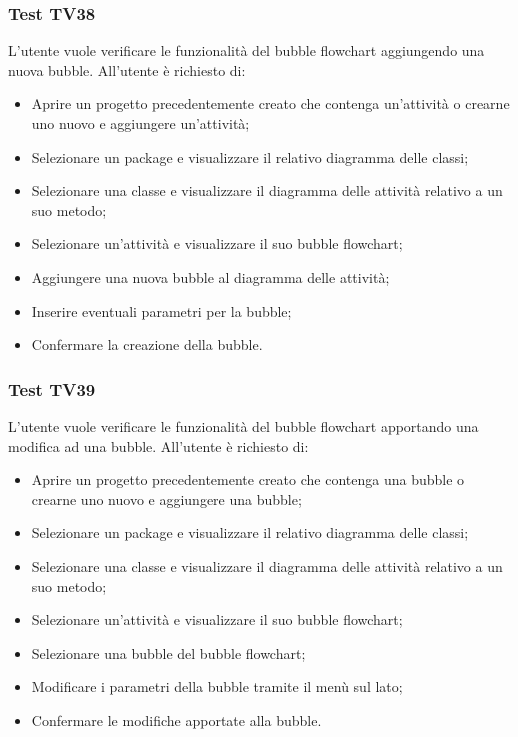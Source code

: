 \documentclass[../PianoDiQualifica.tex]{subfiles}
\begin{document}
	
	
	\subsubsection{Test TV38} 
	L'utente vuole verificare le funzionalità del bubble flowchart aggiungendo una nuova bubble. 
	All'utente è richiesto di: 
	\begin{itemize} 
		\item Aprire un progetto precedentemente creato che contenga un'attività o crearne uno nuovo e aggiungere un'attività;
		\item Selezionare un package e visualizzare il relativo diagramma delle classi; 
		\item Selezionare una classe e visualizzare il diagramma delle attività relativo a un suo metodo; %
		\item Selezionare un'attività e visualizzare il suo bubble flowchart; 
		\item Aggiungere una nuova bubble al diagramma delle attività; 
		\item Inserire eventuali parametri per la bubble; 
		\item Confermare la creazione della bubble.%
	\end{itemize} 
	
	\subsubsection{Test TV39} 
	L'utente vuole verificare le funzionalità del bubble flowchart apportando una modifica ad una bubble. 
	All'utente è richiesto di: 
	\begin{itemize} 
		\item Aprire un progetto precedentemente creato che contenga una bubble o crearne uno nuovo e aggiungere una bubble;
		\item Selezionare un package e visualizzare il relativo diagramma delle classi; 
		\item Selezionare una classe e visualizzare il diagramma delle attività relativo a un suo metodo; 
		\item Selezionare un'attività e visualizzare il suo bubble flowchart; 
		\item Selezionare una bubble del bubble flowchart; 
		\item Modificare i parametri della bubble tramite il menù sul lato;%
		\item Confermare le modifiche apportate alla bubble. 
	\end{itemize} 
	
\end{document}
